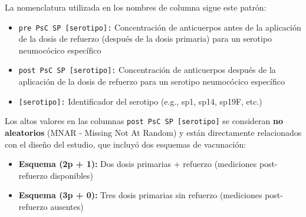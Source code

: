 La nomenclatura utilizada en los nombres de columna sigue este patrón:
\begin{itemize}
    \item \texttt{pre PsC SP [serotipo]:} Concentración de anticuerpos antes de la aplicación de la dosis de refuerzo (después de la dosis primaria) para un serotipo neumocócico específico
    \item \texttt{post PsC SP [serotipo]:} Concentración de anticuerpos después de la aplicación de la dosis de refuerzo para un serotipo neumocócico específico
    \item \texttt{[serotipo]:} Identificador del serotipo (e.g., sp1, sp14, sp19F, etc.)
\end{itemize}


Los altos valores en las columnas \texttt{post PsC SP [serotipo]} se consideran \textbf{no aleatorios} (MNAR - Missing Not At Random) y están directamente relacionados con el diseño del estudio, que incluyó dos esquemas de vacunación:

\begin{itemize}
    \item \textbf{Esquema (2p + 1):} Dos dosis primarias + refuerzo (mediciones post-refuerzo disponibles)
    \item \textbf{Esquema (3p + 0):} Tres dosis primarias sin refuerzo (mediciones post-refuerzo ausentes)
\end{itemize}



